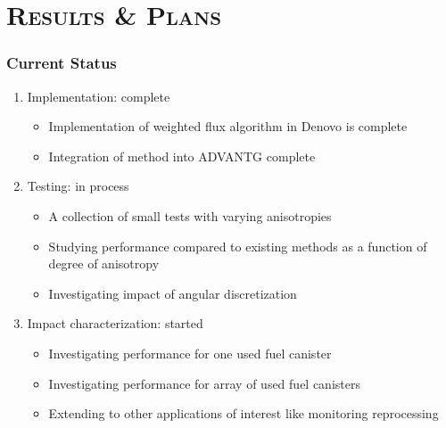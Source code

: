 \documentclass[xcolor=x11names,compress,handout]{beamer}
\renewcommand{\(}{\begin{columns}}
\renewcommand{\)}{\end{columns}}
\newcommand{\<}[1]{\begin{column}{#1}}
\renewcommand{\>}{\end{column}}
\begin{document}
\section{\scshape Results \& Plans}
\begin{frame}[fragile]
  \frametitle{Current Status}

    \begin{enumerate}
    \item Implementation: \alert{complete}
      \begin{itemize}
      \item Implementation of weighted flux algorithm in Denovo \cite{Evans2010} is 
      complete
      \item Integration of method into ADVANTG complete
      \end{itemize} 
      \vspace*{0.5em}
      \pause
    \item Testing: \alert{in process}
      \begin{itemize}
      \item A collection of small tests with varying anisotropies
      \item Studying performance compared to existing methods as a function of degree of anisotropy
      \item Investigating impact of angular discretization
      \end{itemize}
      \vspace*{0.5em}
      \pause
    \item Impact characterization: \alert{started}
      \begin{itemize}
      \item Investigating performance for one used fuel canister
      \item Investigating performance for array of used fuel canisters
      \item Extending to other applications of interest like monitoring reprocessing
      \end{itemize}
    \end{enumerate}

	
\end{frame}
\end{document}
